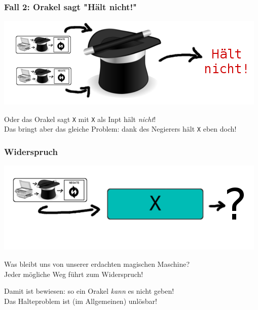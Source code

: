 \documentclass[aspectratio=169]{beamer}
\begin{document}
\begin{frame}
\frametitle{Fall 2: Orakel sagt "Hält nicht!"}

\begin{center}
\includegraphics[scale=1.4]{images/input_hat_haltsnot.png} 
\bigskip

Oder das Orakel sagt \texttt{X} mit \texttt{X} als Inpt hält \emph{nicht}!\\
 Das bringt aber das gleiche Problem: dank des Negierers hält \texttt{X} eben doch! 
\end{center}
\end{frame}


\begin{frame}
\frametitle{Widerspruch}
\begin{center}
\includegraphics[scale=1.4]{images/input.png} 
\bigskip

Was bleibt uns von unserer erdachten magischen Maschine?\\
Jeder mögliche Weg führt zum Widerspruch!
\pause\bigskip

Damit ist bewiesen: so ein Orakel \emph{kann} es nicht geben!\\
Das Halteproblem ist (im Allgemeinen) unlösbar!
\end{center}
\end{frame}

\end{document}
